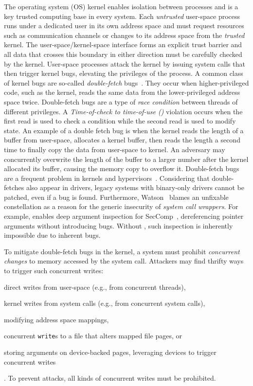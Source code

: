 \documentclass[letterpaper,twocolumn,10pt, anonymous]{article}
\begin{document}
The operating system (OS) kernel enables isolation between processes and is 
a key trusted computing
base in every system. Each \emph{untrusted} user-space process runs under a
dedicated user in its own address space and must request resources such as
communication channels or changes to its address space from the \emph{trusted}
kernel. The user-space/kernel-space interface forms an explicit trust barrier
and all data that crosses this boundary in either direction must be carefully 
checked by the kernel.
%
User-space processes attack the kernel by issuing system calls that then trigger
kernel bugs, elevating the privileges of the process.
%
A common class of kernel bugs are so-called \emph{double-fetch}
bugs~\cite{serna08doublefetch, twizsgrakky07ring0, wilhelm2016xenpwn,
wang2018survey}. They occur when higher-privileged code, such as
the kernel, reads the same data from the lower-privileged address space twice.
%
Double-fetch bugs are a type of
\emph{race condition} between threads of different privileges. A
\emph{Time-of-check to time-of-use (\tocttou)} violation occurs when the first
read is used to check a condition while the second read is used to modify
state.
%
An example of a double fetch bug is when the kernel reads the length of a buffer
from user-space, allocates a kernel buffer, then reads the length a second time
to finally copy the data from user-space to kernel. An adversary may concurrently
overwrite the length of the buffer to a larger number after the kernel allocated
its buffer, causing the memory copy to overflow it.
%
Double-fetch bugs are a frequent problem in kernels and
hypervisors~\cite{cve201812633, cve202012652, cve20131332, cve201920610,
cve20158550, cve201610439, cve201610435, cve201610433, cve20195519,
cve20168438}. Considering that double-fetches also appear in drivers, legacy
systems with binary-only drivers cannot be patched, even if a bug is found.
Furthermore, Watson~\cite{watson2007exploiting} blames an unfixable \tocttou
constellation as a reason for the generic insecurity of \emph{system call
wrappers}. For example, \tiktok enables deep argument inspection for 
SecComp~\cite{seccomp_deep, seccomp}, dereferencing pointer arguments without introducing 
\tocttou bugs. Without \tiktok, such inspection is inherently impossible due to
inherent \tocttou bugs.

To mitigate double-fetch bugs in the kernel, a system must prohibit
\emph{concurrent changes} to memory accessed by the system call. Attackers may
find thrifty ways to trigger such concurrent writes:
\begin{inparaenum}
\item  direct writes from user-space (e.g., from concurrent threads),
\item  kernel writes from system calls (e.g., from concurrent system calls),
\item  modifying address space mappings,
\item  concurrent \texttt{write}s to a file that alters mapped
file pages, or
\item  storing arguments on device-backed pages, leveraging devices to trigger
concurrent writes
\end{inparaenum}.
To prevent attacks, all kinds of concurrent writes must be prohibited.
\end{document}
